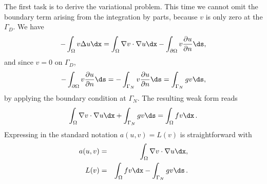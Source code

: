 The first task is to derive the variational problem. This time we cannot
omit the boundary term arising from the integration by parts, because
$v$ is only zero at the $\Gamma_D$. We have
\[
 -\int_\Omega v\Delta u \dx
= \int_\Omega\nabla v\cdot\nabla u\dx - \int_{\partial\Omega}v{\partial u\over
\partial n}\ds,
\]
and since $v=0$ on $\Gamma_D$,
\[ 
- \int_{\partial\Omega}v{\partial u\over
\partial n}\ds
=
- \int_{\Gamma_N}v{\partial u\over
\partial n}\ds
= \int_{\Gamma_N}gv\ds,
\]
by applying the boundary condition at $\Gamma_N$.
The resulting weak form reads
\begin{equation}
\int_{\Omega} \nabla v \cdot \nabla u \dx +
\int_{\Gamma_N} g v\ds
= \int_{\Omega} fv \dx\langtangenep
\label{langtangen:poisson:2D:DN:weak}
\end{equation}
Expressing 
in the standard notation $a(u,v)=L(v)$ is straightforward with
\begin{eqnarray}
a(u, v) &=& \int_{\Omega} \nabla v \cdot \nabla u \dx,
\label{langtangen:poisson2:vard:a}\\
L(v) &=& \int_{\Omega} fv \dx -
\int_{\Gamma_N} g v\ds\langtangenep\label{langtangen:poisson2:vard:L}
\end{eqnarray}

